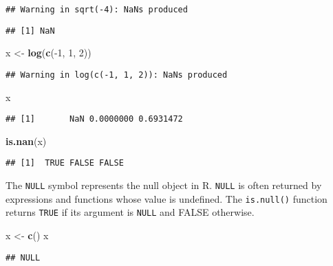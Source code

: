 \documentclass[]{book}
\newenvironment{Shaded}{\begin{snugshade}}{\end{snugshade}}
\newcommand{\KeywordTok}[1]{\textcolor[rgb]{0.13,0.29,0.53}{\textbf{{#1}}}}
\newcommand{\DecValTok}[1]{\textcolor[rgb]{0.00,0.00,0.81}{{#1}}}
\newcommand{\StringTok}[1]{\textcolor[rgb]{0.31,0.60,0.02}{{#1}}}
\newcommand{\NormalTok}[1]{{#1}}
\begin{document}
\begin{verbatim}
## Warning in sqrt(-4): NaNs produced
\end{verbatim}

\begin{verbatim}
## [1] NaN
\end{verbatim}

\begin{Shaded}
\begin{Highlighting}[]
\NormalTok{x <-}\StringTok{ }\KeywordTok{log}\NormalTok{(}\KeywordTok{c}\NormalTok{(-}\DecValTok{1}\NormalTok{, }\DecValTok{1}\NormalTok{, }\DecValTok{2}\NormalTok{))}
\end{Highlighting}
\end{Shaded}

\begin{verbatim}
## Warning in log(c(-1, 1, 2)): NaNs produced
\end{verbatim}

\begin{Shaded}
\begin{Highlighting}[]
\NormalTok{x}
\end{Highlighting}
\end{Shaded}

\begin{verbatim}
## [1]       NaN 0.0000000 0.6931472
\end{verbatim}

\begin{Shaded}
\begin{Highlighting}[]
\KeywordTok{is.nan}\NormalTok{(x)}
\end{Highlighting}
\end{Shaded}

\begin{verbatim}
## [1]  TRUE FALSE FALSE
\end{verbatim}

The \texttt{NULL} symbol represents the null object in R. \texttt{NULL}
is often returned by expressions and functions whose value is undefined.
The \texttt{is.null()} function returns \texttt{TRUE} if its argument is
\texttt{NULL} and FALSE otherwise.

\begin{Shaded}
\begin{Highlighting}[]
\NormalTok{x <-}\StringTok{ }\KeywordTok{c}\NormalTok{()}
\NormalTok{x}
\end{Highlighting}
\end{Shaded}

\begin{verbatim}
## NULL
\end{verbatim}
\end{document}
